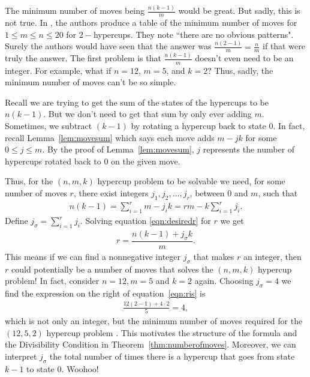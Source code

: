 \documentclass{article}
\theoremstyle{theorem}
\theoremstyle{definition}
\begin{document}
The minimum number of moves being  $\frac{n(k-1)}{m}$ would be great. But sadly, this is not true. In \cite{SS10}, the authors produce a table of the minimum number of moves for $1\leq m \leq n \leq 20$ for $2-$hypercups. They note ``there are no obvious patterns". Surely the authors would have seen that the answer was $\frac{n(2-1)}{m} = \frac{n}{m}$ if that were truly the answer. The first problem is that $\frac{n(k-1)}{m}$ doesn't even need to be an integer. For example, what if $n=12$, $m=5$, and $k=2$? Thus, sadly, the minimum number of moves can't be so simple.

Recall we are trying to get the sum of the states of the hypercups to be $n(k-1)$. But we don't need to get that sum by only ever adding $m$. Sometimes, we subtract $(k-1)$ by rotating a hypercup back to state $0$. In fact, recall Lemma~\ref{lem:movesum} which says each move adds $m-jk$ for some $0\le j \le m$. By the proof of Lemma~\ref{lem:movesum}, $j$ represents the number of hypercups rotated back to $0$ on the given move. 

Thus, for the $(n,m,k)$ hypercup problem to be solvable we need, for some number of moves $r$, there exist integers $j_1, j_2, \dots, j_r$, between $0$ and $m$, such that 
\begin{align}
   n(k-1) = \sum_{i=1}^r m-j_i k = rm - k \sum_{i=1}^r j_i.\label{eqn:desiredr}
\end{align}
Define $j_\sigma = \sum_{i=1}^r j_i$. Solving equation \ref{eqn:desiredr} for $r$ we get 
\begin{align}
    r = \dfrac{n(k-1)+j_\sigma k}{m}. \label{eqn:ris}
\end{align}
This means if we can find a nonnegative integer $j_\sigma$ that makes $r$ an integer, then $r$ could potentially be a number of moves that solves the $(n,m,k)$ hypercup problem! In fact, consider $n=12, m=5$ and $k=2$ again. Choosing $j_\sigma = 4$ we find the expression on the right of equation~\ref{eqn:ris} is
\begin{align*}
    \frac{12(2-1)+4\cdot 2}{5} = 4,
\end{align*}
which is not only an integer, but the minimum number of moves required for the $(12,5,2)$ hypercup problem \cite{SS10}. This motivates the structure of the formula and the Divisibility Condition in Theorem~\ref{thm:numberofmoves}. Moreover, we can interpret $j_\sigma$ the total number of times there is a hypercup that goes from state $k-1$ to state $0$. Woohoo!
\end{document}
